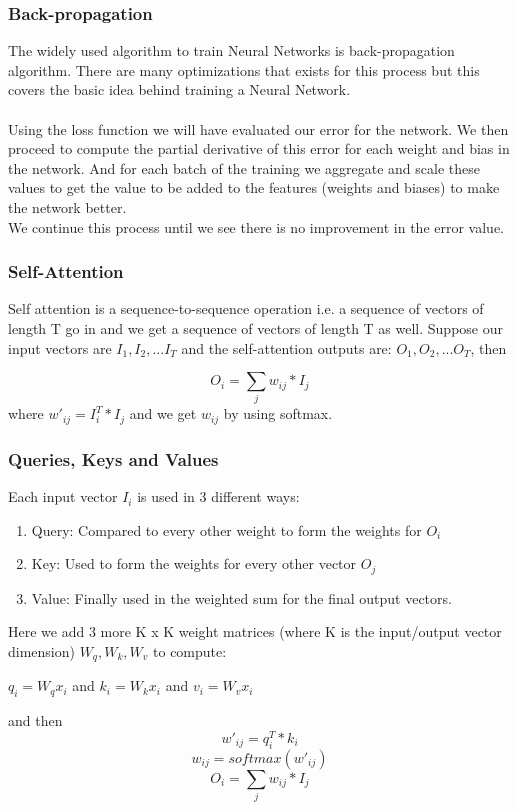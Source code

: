 \documentclass[12pt, a4paper]{article}
\begin{document}
\subsubsection*{Back-propagation}
The widely used algorithm to train Neural Networks is back-propagation algorithm. There are many optimizations that exists for this process but this covers the basic idea behind training a Neural Network. \\\\
Using the loss function we will have evaluated our error for the network. We then proceed to compute the partial derivative of this error for each weight and bias in the network. And for each batch of the training we aggregate and scale these values to get the value to be added to the features (weights and biases) to make the network better. \\
We continue this process until we see there is no improvement in the error value. 

\subsubsection*{Self-Attention}
Self attention is a sequence-to-sequence operation i.e. a sequence of vectors of length T go in and we get a sequence of vectors of length T as well. Suppose our input vectors are \( I_1, I_2, ... I_T \) and the self-attention outputs are: \( O_1, O_2,... O_T \), then

\[ O_i = \sum_j w_{ij} * I_j\] 
where \( w'_{ij} = I_i^T * I_j\) and we get \(w_{ij}\) by using softmax.

\subsubsection*{Queries, Keys and Values}
Each input vector $I_i$ is used in 3 different ways:
\begin{enumerate}
  \item Query: Compared to every other weight to form the weights for $O_i$
  \item Key: Used to form the weights for every other vector $O_j$
  \item Value: Finally used in the weighted sum for the final output vectors.
\end{enumerate}

Here we add 3 more K x K weight matrices (where K is the input/output vector dimension) \( W_q, W_k , W_v\) to compute:
\begin{center}
\(q_i = W_q x_i\) \textrm{and}  \(k_i = W_k x_i\) \textrm{and}  \(v_i = W_v x_i\)
\end{center}
and then
\[w'_{ij} = q_i^T * k_i\]
\[w_{ij} = softmax(w'_{ij})\]
\[O_i = \sum_j w_{ij} * I_j\]
\end{document}
